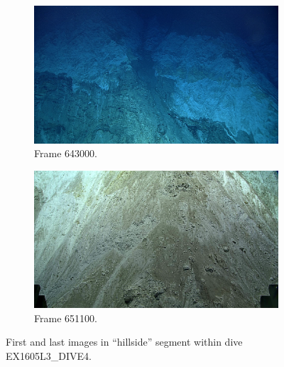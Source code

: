 \documentclass[letterpaper,12pt]{article}
\begin{document}
\begin{figure}[p]
    \centering
    \begin{subfigure}[b]{0.48\textwidth}
        \includegraphics[width=\textwidth]{images/image_643000.png}
        \caption{Frame 643000.}
        \label{fig:ex1605l3_dive4_hillside_begin}
    \end{subfigure}
    \begin{subfigure}[b]{0.48\textwidth}
        \includegraphics[width=\textwidth]{images/image_651100.png}
        \caption{Frame 651100.}
        \label{fig:ex1605l3_dive4_hillside_end}
    \end{subfigure}
    \caption{First and last images in ``hillside'' segment within dive EX1605L3\_DIVE4.}
\end{figure}
\end{document}
